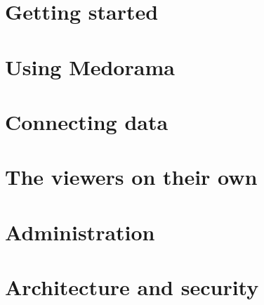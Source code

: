 \documentclass[11pt,a4paper,oneside,openany]{book}
\begin{document}
\part{Getting started}
\label{part:start}




\part{Using Medorama}
\label{part:using}







\part{Connecting data}
\label{part:data}






\part{The viewers on their own}
\label{part:viewers}





\part{Administration}
\label{part:admin}








\part{Architecture and security}
\label{part:design}



\end{document}
